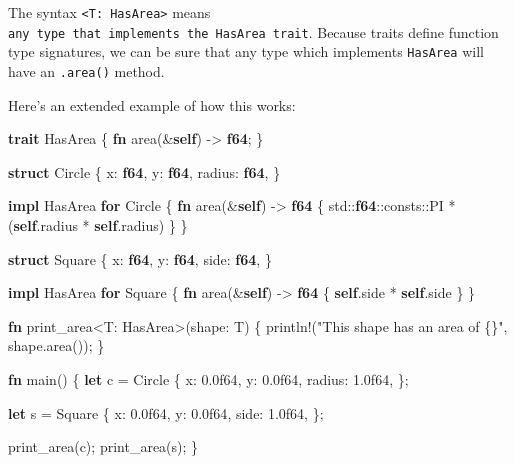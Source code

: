 \documentclass[a4paper,]{book}
\newenvironment{Shaded}{\begin{snugshade}}{\end{snugshade}}
\newcommand{\KeywordTok}[1]{\textcolor[rgb]{0.13,0.29,0.53}{\textbf{{#1}}}}
\newcommand{\DecValTok}[1]{\textcolor[rgb]{0.00,0.00,0.81}{{#1}}}
\newcommand{\StringTok}[1]{\textcolor[rgb]{0.31,0.60,0.02}{{#1}}}
\newcommand{\OtherTok}[1]{\textcolor[rgb]{0.56,0.35,0.01}{{#1}}}
\newcommand{\NormalTok}[1]{{#1}}
\begin{document}
The syntax \texttt{\textless{}T:\ HasArea\textgreater{}} means
\texttt{any\ type\ that\ implements\ the\ HasArea\ trait}. Because
traits define function type signatures, we can be sure that any type
which implements \texttt{HasArea} will have an \texttt{.area()} method.

Here's an extended example of how this works:

\begin{Shaded}
\begin{Highlighting}[]
\KeywordTok{trait} \NormalTok{HasArea \{}
    \KeywordTok{fn} \NormalTok{area(&}\KeywordTok{self}\NormalTok{) -> }\KeywordTok{f64}\NormalTok{;}
\NormalTok{\}}

\KeywordTok{struct} \NormalTok{Circle \{}
    \NormalTok{x: }\KeywordTok{f64}\NormalTok{,}
    \NormalTok{y: }\KeywordTok{f64}\NormalTok{,}
    \NormalTok{radius: }\KeywordTok{f64}\NormalTok{,}
\NormalTok{\}}

\KeywordTok{impl} \NormalTok{HasArea }\KeywordTok{for} \NormalTok{Circle \{}
    \KeywordTok{fn} \NormalTok{area(&}\KeywordTok{self}\NormalTok{) -> }\KeywordTok{f64} \NormalTok{\{}
        \NormalTok{std::}\KeywordTok{f64}\NormalTok{::consts::PI * (}\KeywordTok{self}\NormalTok{.radius * }\KeywordTok{self}\NormalTok{.radius)}
    \NormalTok{\}}
\NormalTok{\}}

\KeywordTok{struct} \NormalTok{Square \{}
    \NormalTok{x: }\KeywordTok{f64}\NormalTok{,}
    \NormalTok{y: }\KeywordTok{f64}\NormalTok{,}
    \NormalTok{side: }\KeywordTok{f64}\NormalTok{,}
\NormalTok{\}}

\KeywordTok{impl} \NormalTok{HasArea }\KeywordTok{for} \NormalTok{Square \{}
    \KeywordTok{fn} \NormalTok{area(&}\KeywordTok{self}\NormalTok{) -> }\KeywordTok{f64} \NormalTok{\{}
        \KeywordTok{self}\NormalTok{.side * }\KeywordTok{self}\NormalTok{.side}
    \NormalTok{\}}
\NormalTok{\}}

\KeywordTok{fn} \NormalTok{print_area<T: HasArea>(shape: T) \{}
    \OtherTok{println!}\NormalTok{(}\StringTok{"This shape has an area of \{\}"}\NormalTok{, shape.area());}
\NormalTok{\}}

\KeywordTok{fn} \NormalTok{main() \{}
    \KeywordTok{let} \NormalTok{c = Circle \{}
        \NormalTok{x: }\DecValTok{0.0f64}\NormalTok{,}
        \NormalTok{y: }\DecValTok{0.0f64}\NormalTok{,}
        \NormalTok{radius: }\DecValTok{1.0f64}\NormalTok{,}
    \NormalTok{\};}

    \KeywordTok{let} \NormalTok{s = Square \{}
        \NormalTok{x: }\DecValTok{0.0f64}\NormalTok{,}
        \NormalTok{y: }\DecValTok{0.0f64}\NormalTok{,}
        \NormalTok{side: }\DecValTok{1.0f64}\NormalTok{,}
    \NormalTok{\};}

    \NormalTok{print_area(c);}
    \NormalTok{print_area(s);}
\NormalTok{\}}
\end{Highlighting}
\end{Shaded}
\end{document}
